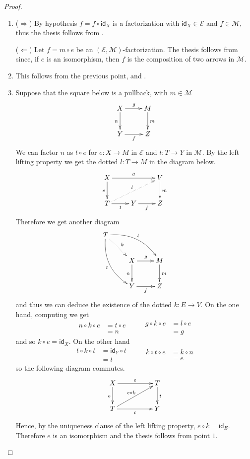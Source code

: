 \documentclass[a4paper,UKenglish,cleveref,pdftex,thm-restate,numberwithinsect]{lipics-v2021}
\newcommand{\id}[1]{\mathsf{id}_{#1}}
\begin{document}
\begin{proof}
	\begin{enumerate}
		\item  ($\Rightarrow$) By hypothesis $f=f\circ \id{X}$ is a factorization with $\id{X}\in \mathcal{E}$ and $f\in \mathcal{M}$, thus the thesis follows from .
		
		\smallskip \noindent
		($\Leftarrow$) Let $f=m\circ e$ be an $(\mathcal{E}, \mathcal{M})$-factorization. The thesis  follows from  since, if $e$ is an isomorphism, then $f$ is the composition of two arrows in $\mathcal{M}$.
		
		\item This follows from the previous point,  and .
		
		\item 	Suppose that the square below is a pullback, with $m\in \mathcal{M}$
		\[\xymatrix{X\ar[r]^{g} \ar[d]_{n} & M \ar[d]^{m} \\ Y \ar[r]_{f}  & Z}\] 
		We can factor  $n$ as $t\circ e$ for $e\colon X\to M$ in  $\mathcal{E}$ and $t\colon T\to Y$ in $ \mathcal{M}$.  By the left lifting property we get the dotted $l\colon T\to M$ in the diagram below.
		\[\xymatrix{X \ar[d]_{e}\ar[rr]^{g} & &V\ar[d]^{m}\\  T  \ar@{.>}[urr]^{l} \ar[r]_{t}&Y\ar[r]_{f} & Z}\]
		Therefore we get another diagram
		\[\xymatrix{ T \ar@/^.5cm/[drr]^{l}\ar@{.>}[dr]^{k} \ar@/_.5cm/[ddr]_{t}\\ & X \ar[d]_{n}\ar[r]^{g}& M  \ar[d]^{m} \\ &Y \ar[r]_{f} & Z }\]
		and thus we can deduce the existence of the dotted $k\colon E\to V$. On the one hand, computing we get
		\[\begin{split}
			n\circ 	k\circ e&=t  \circ  e\\ &=n
		\end{split}\qquad \begin{split}
			g\circ k\circ e &=l\circ e\\ &=g \end{split}\]
		and so $k\circ e= \id{X}$.  On the other hand 
		\[\begin{split}
			t\circ k \circ t &= \id{Y} \circ t \\&= t
		\end{split} \qquad 
		\begin{split}
			k \circ t \circ e &= k\circ n \\&= e
		\end{split}
		\]	
		so the following diagram commutes.
		\[
		\xymatrix@C=50pt{X \ar[d]_{e}\ar[r]^{e}& T \ar[d]^{t} \\
			T\ar[ur]^{e\circ k}\ar[r]_{t} & Y}\]
		Hence, by the uniqueness clause of the left lifting property, $e\circ k=\id{E}$. Therefore $e$ is an isomorphism and the thesis follows from  point $1$. 
		

\end{enumerate}
\end{proof}
\end{document}
